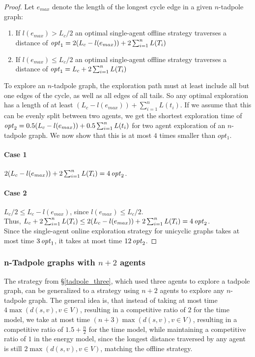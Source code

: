 \begin{proof}
    Let $e_{max}$ denote the length of the longest cycle edge in a given $n$-tadpole graph:
    \begin{enumerate}
        \item If $l(e_{max}) > L_c/2$ an optimal single-agent offline strategy traverses a distance of $\mathop{\mathit{opt}}\nolimits_1 = 2(L_c-l(e_{max}))+2\sum_{i=1}^{n}L(T_i)$
        \item If $l(e_{max}) \leq L_c/2$ an optimal single-agent offline strategy traverses a distance of $\mathop{\mathit{opt}}\nolimits_1 = L_c+2\sum_{i=1}^{n}L(T_i)$
    \end{enumerate}

    To explore an $n$-tadpole graph, the exploration path must at least include all but one edges of the cycle, as well as all edges of all tails. So any optimal exploration
    has a length of at least $(L_c - l(e_{max}))+\sum_{i=1}^{n}L(t_i)$. If we assume that this can be evenly split between two agents, we get the shortest exploration time of 
    $\mathop{\mathit{opt}}\nolimits_2 = 0.5(L_c - l(e_{max}))+0.5\sum_{i=1}^{n}L(t_i)$ for two agent exploration of an $n$-tadpole graph. We now show that this is at most $4$ times smaller than $opt_1$.

    \paragraph*{Case 1} $2(L_c-l(e_{max}))+2\sum_{i=1}^{n}L(T_i) = 4\mathop{\mathit{opt}}\nolimits_2$.
    \paragraph*{Case 2} $L_c/2 \leq L_c - l(e_{max})$, since $l(e_{max}) \leq L_c/2$.\\
    \hspace*{1em} Thus, $L_c+2\sum_{i=1}^{n}L(T_i) \leq 2(L_c - l(e_{max})) + 2\sum_{i=1}^{n}L(T_i) = 4\mathop{\mathit{opt}}\nolimits_2$.\\

    Since the single-agent online exploration strategy for unicyclic graphs takes at most time $3\mathop{\mathit{opt}}\nolimits_1$, it takes at most time $12\mathop{\mathit{opt}}\nolimits_2$.
\end{proof}

\subsubsection{n-Tadpole graphs with $n+2$ agents}\label{ntad_three}

The strategy from \S\ref{tadpole_three}, which used three agents to explore a tadpole graph, can be generalized to a strategy using $n+2$ agents to explore any $n$-tadpole graph.
The general idea is, that instead of taking at most time $4\max(d(s,v), v\in V)$, resulting in a competitive ratio of $2$ for the time model, we take at most time $(n+3)\max(d(s,v), v\in V)$,
resulting in a competitive ratio of $1.5+\frac{n}{2}$ for the time model, while maintaining a competitive ratio of $1$ in the energy model, since the longest distance traversed by any agent is
still $2\max(d(s,v), v\in V)$, matching the offline strategy. 


